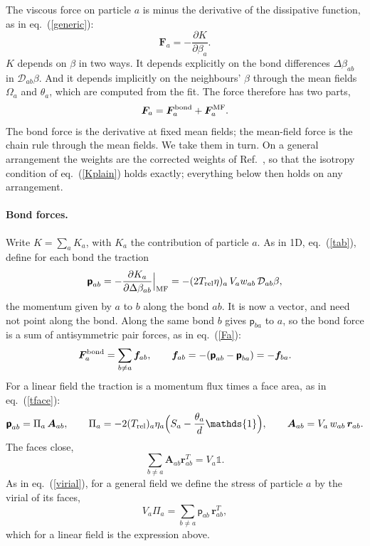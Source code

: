 \documentclass[11pt,aps,preprint,nofootinbib,superscriptaddress,tightenlines]{revtex4-2}
\def\st{\begin{equation}}
\def\stp{\end{equation}}
\def\Eq#1{eq.~(\ref{#1})}
\newcommand{\one}{\mathds{1}}
\newcommand{\pf}{\bm{\mathsf p}}
\let\oldparagraph\paragraph
\renewcommand{\paragraph}{\par\bigskip\oldparagraph}
\begin{document}
The viscous force on particle $a$ is minus the derivative of the dissipative
function, as in \Eq{generic}:
\st
\bm F_a=-\frac{\partial K}{\partial\beta_a} .
\stp
$K$ depends on $\beta$ in two ways.  It depends explicitly on the bond
differences $\Delta\beta_{ab}$ in $\mathcal D_{ab}\beta$.  And it depends
implicitly on the neighbours' $\beta$ through the mean fields $\Omega_a$ and
$\theta_a$, which are computed from the fit.  The force therefore has two parts,
\st
\bm F_a=\bm F_a^{\rm bond}+\bm F_a^{\rm MF} .
\stp
The bond force is the derivative at fixed mean fields; the mean-field force is
the chain rule through the mean fields.  We take them in turn.  On a general
arrangement the weights are the corrected weights of
Ref.~\cite{ParticleMetrics}, so that the isotropy condition of \Eq{Kplain}
holds exactly; everything below then holds on any arrangement.

\paragraph{Bond forces.}  Write $K=\sum_aK_a$, with $K_a$ the contribution of
particle $a$.  As in 1D, \Eq{tab}, define for each bond the traction
\st
\pf_{ab}=-\frac{\partial K_a}{\partial\Delta\beta_{ab}}\Big|_{\rm MF}
=-(2T_{\rm rel}\eta)_a\,V_aw_{ab}\,\mathcal D_{ab}\beta ,
\label{tab2d}
\stp
the momentum given by $a$ to $b$ along the bond $ab$.  It is now a vector, and
need not point along the bond.  Along the same bond $b$ gives $\pf_{ba}$ to
$a$, so the bond force is a sum of antisymmetric pair forces, as in \Eq{Fa}:
\st
\bm F_a^{\rm bond}=\sum_{b\neq a}\bm f_{ab},\qquad
\bm f_{ab}=-(\pf_{ab}-\pf_{ba})=-\bm f_{ba} .
\stp
For a linear field the traction is a momentum flux times a face area, as in
\Eq{tface}:
\st
\pf_{ab}=\Pi_a\,\bm A_{ab},\qquad
\Pi_a=-2(T_{\rm rel})_a\eta_a\Big(S_a-\frac{\theta_a}{d}\one\Big),\qquad
\bm A_{ab}=V_a\,w_{ab}\,\bm r_{ab} .
\stp
The faces close,
\st
\sum_{b\neq a}\bm A_{ab}\bm r_{ab}^T=V_a\one .
\stp
As in \Eq{virial}, for a
general field we define the stress of particle $a$ by the virial of its faces,
\st
V_a\Pi_a=\sum_{b\neq a}\pf_{ab}\,\bm r_{ab}^T ,
\label{virial2d}
\stp
which for a linear field is the expression above.
\end{document}

